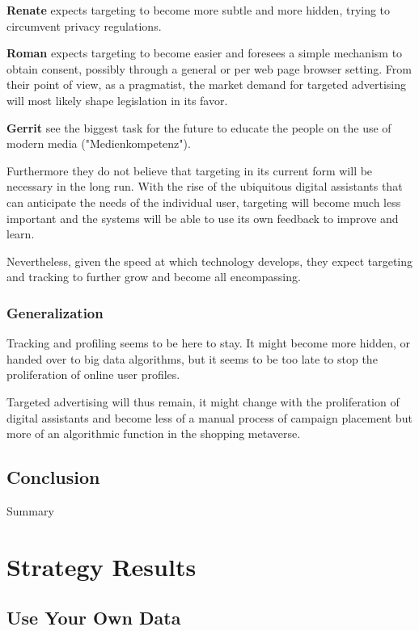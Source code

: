 \textbf{Renate} expects targeting to become more subtle and more hidden, trying to circumvent privacy regulations.

\textbf{Roman} expects targeting to become easier and foresees a simple mechanism to obtain consent, possibly through a general or per web page browser setting. From their point of view, as a pragmatist, the market demand for targeted advertising will most likely shape legislation in its favor.

\textbf{Gerrit} see the biggest task for the future to educate the people on the use of modern media ("Medienkompetenz").

Furthermore they do not believe that targeting in its current form will be necessary in the long run. With the rise of the ubiquitous digital assistants that can anticipate the needs of the individual user, targeting will become much less important and the systems will be able to use its own feedback to improve and learn.

Nevertheless, given the speed at which technology develops, they expect targeting and tracking to further grow and become all encompassing.

\subsubsection{Generalization}

Tracking and profiling seems to be here to stay. It might become more hidden, or handed over to big data algorithms, but it seems to be too late to stop the proliferation of online user profiles. 

Targeted advertising will thus remain, it might change with the proliferation of digital assistants and become less of a manual process of campaign placement but more of an algorithmic function in the shopping metaverse.

\subsection{Conclusion}

Summary

\pagebreak
\section{Strategy Results}

\onehalfspacing

\subsection{Use Your Own Data}

